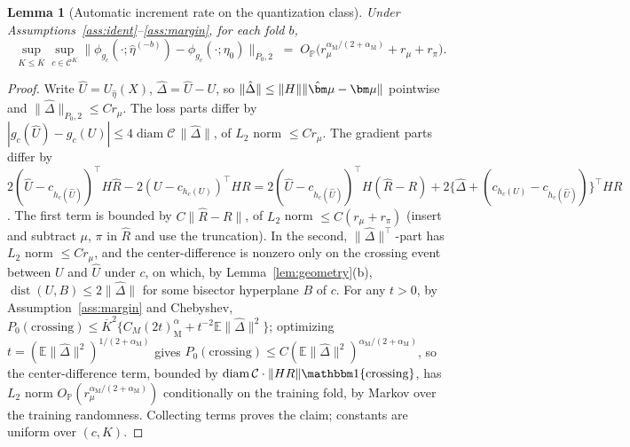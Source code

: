 \documentclass[11pt]{article}
\newtheorem{lemma}{Lemma}
\newcommand{\E}{\mathbb E}
\newcommand{\Pp}{\mathbb P}
\newcommand{\ind}[1]{\mathbbm 1\{#1\}}
\newcommand{\Op}{O_{\Pp}}
\newcommand{\dist}{\operatorname{dist}}
\newcommand{\diam}{\operatorname{diam}}
\newcommand{\calC}{\mathcal C}
\newcommand{\bmu}{\bm\mu}
\newcommand{\hateta}{\widehat\eta}
\newcommand{\hU}{\widehat U}
\newcommand{\hR}{\widehat R}
\newcommand{\norm}[1]{\lVert #1\rVert}
\newcommand{\am}{\alpha_{\mathrm M}}
\begin{document}
\begin{lemma}[Automatic increment rate on the quantization class]\label{lem:deltaqt}
Under Assumptions~\ref{ass:ident}--\ref{ass:margin}, for each fold $b$,
\begin{equation*}
\sup_{K\le\overline K}\sup_{c\in\calC^K}\norm{\phi_{g_c}(\cdot;\hateta^{(-b)})-\phi_{g_c}(\cdot;\eta_0)}_{P_0,2}
\;=\;\Op\bigl(r_\mu^{\am/(2+\am)}+r_\mu+r_\pi\bigr).
\end{equation*}
\end{lemma}

\begin{proof}
Write $\hU=U_{\hateta}(X)$, $\hat\Delta=\hU-U$, so $\norm{\hat\Delta}\le\norm{H}\norm{\hat\bmu-\bmu}$ pointwise and $\norm{\hat\Delta}_{P_0,2}\le Cr_\mu$. The loss parts differ by $|g_c(\hU)-g_c(U)|\le4\diam\calC\,\norm{\hat\Delta}$, of $L_2$ norm $\le Cr_\mu$. The gradient parts differ by
$2(\hU-c_{h_c(\hU)})^\top H\hR-2(U-c_{h_c(U)})^\top HR
=2(\hU-c_{h_c(\hU)})^\top H(\hR-R)+2\{\hat\Delta+(c_{h_c(U)}-c_{h_c(\hU)})\}^\top HR$.
The first term is bounded by $C\norm{\hR-R}$, of $L_2$ norm $\le C(r_\mu+r_\pi)$ (insert and subtract $\mu$, $\pi$ in $\hR$ and use the truncation). In the second, $\norm{\hat\Delta}^\top$-part has $L_2$ norm $\le Cr_\mu$, and the center-difference is nonzero only on the crossing event between $U$ and $\hU$ under $c$, on which, by Lemma~\ref{lem:geometry}(b), $\dist(U,B)\le2\norm{\hat\Delta}$ for some bisector hyperplane $B$ of $c$. For any $t>0$, by Assumption~\ref{ass:margin} and Chebyshev,
$P_0(\text{crossing})\le\overline K^2\bigl\{C_M(2t)^\am +t^{-2}\E\norm{\hat\Delta}^2\bigr\}$;
optimizing $t=(\E\norm{\hat\Delta}^2)^{1/(2+\am)}$ gives $P_0(\text{crossing})\le C(\E\norm{\hat\Delta}^2)^{\am/(2+\am)}$, so the center-difference term, bounded by $\diam\calC\cdot\norm{HR}\ind{\text{crossing}}$, has $L_2$ norm $\Op(r_\mu^{\am/(2+\am)})$ conditionally on the training fold, by Markov over the training randomness. Collecting terms proves the claim; constants are uniform over $(c,K)$.
\end{proof}
\end{document}
